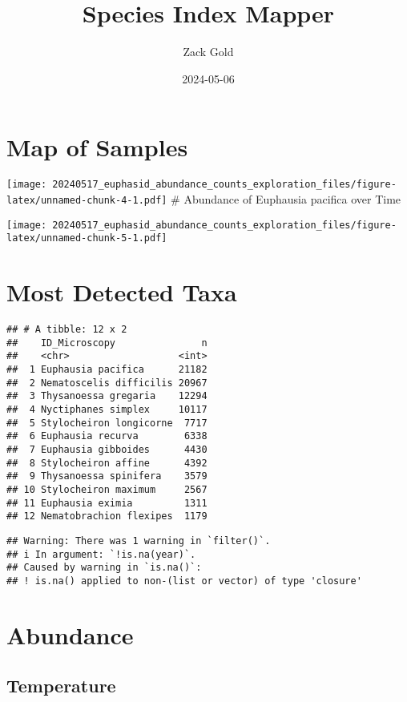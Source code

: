 \documentclass[
]{article}
\title{Species Index Mapper}
\author{Zack Gold}
\date{2024-05-06}
\begin{document}
\maketitle

\hypertarget{map-of-samples}{%
\section{Map of Samples}\label{map-of-samples}}

\texttt{[image: 20240517\_euphasid\_abundance\_counts\_exploration\_files/figure-latex/unnamed-chunk-4-1.pdf]}
\# Abundance of Euphausia pacifica over Time

\texttt{[image: 20240517\_euphasid\_abundance\_counts\_exploration\_files/figure-latex/unnamed-chunk-5-1.pdf]}

\hypertarget{most-detected-taxa}{%
\section{Most Detected Taxa}\label{most-detected-taxa}}

\begin{verbatim}
## # A tibble: 12 x 2
##    ID_Microscopy               n
##    <chr>                   <int>
##  1 Euphausia pacifica      21182
##  2 Nematoscelis difficilis 20967
##  3 Thysanoessa gregaria    12294
##  4 Nyctiphanes simplex     10117
##  5 Stylocheiron longicorne  7717
##  6 Euphausia recurva        6338
##  7 Euphausia gibboides      4430
##  8 Stylocheiron affine      4392
##  9 Thysanoessa spinifera    3579
## 10 Stylocheiron maximum     2567
## 11 Euphausia eximia         1311
## 12 Nematobrachion flexipes  1179
\end{verbatim}

\begin{verbatim}
## Warning: There was 1 warning in `filter()`.
## i In argument: `!is.na(year)`.
## Caused by warning in `is.na()`:
## ! is.na() applied to non-(list or vector) of type 'closure'
\end{verbatim}

\hypertarget{abundance}{%
\section{Abundance}\label{abundance}}

\hypertarget{temperature}{%
\subsection{Temperature}\label{temperature}}
\end{document}
